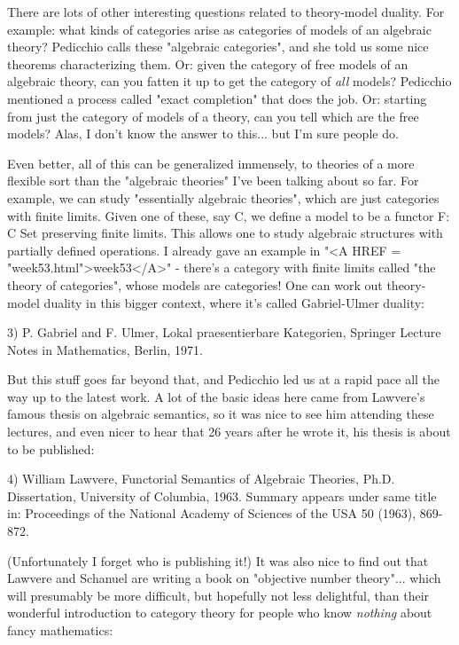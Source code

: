 There are lots of other interesting questions related to
theory-model duality.  For example: what kinds of categories
arise as categories of models of an algebraic theory?  Pedicchio
calls these "algebraic categories", and she told us some nice 
theorems characterizing them.  Or: given the category of free
models of an algebraic theory, can you fatten it up to get 
the category of \emph{all} models?   Pedicchio mentioned a process
called "exact completion" that does the job.  Or: starting 
from just the category of models of a theory, can you tell 
which are the free models?  Alas, I don't know the answer
to this... but I'm sure people do.

Even better, all of this can be generalized immensely, to 
theories of a more flexible sort than the "algebraic theories"
I've been talking about so far.   For example, we can study
"essentially algebraic theories", which are just categories
with finite limits.  Given one of these, say C, we define a
model to be a functor F: C \to  Set preserving finite limits.
This allows one to study algebraic structures with 
partially defined operations.  I already gave an example in 
"<A HREF = "week53.html">week53</A>" - there's a category with finite limits called 
"the theory of categories", whose models are categories!  
One can work out theory-model duality in this bigger context, 
where it's called Gabriel-Ulmer duality:

3) P. Gabriel and F. Ulmer, Lokal praesentierbare Kategorien,
Springer Lecture Notes in Mathematics, Berlin, 1971. 

But this stuff goes far beyond that, and Pedicchio led us at a 
rapid pace all the way up to the latest work.  A lot of the basic 
ideas here came from Lawvere's famous thesis on algebraic
semantics, so it was nice to see him attending these lectures, and 
even nicer to hear that 26 years after he wrote it, his thesis 
is about to be published:

4) William Lawvere, Functorial Semantics of Algebraic Theories,
Ph.D. Dissertation, University of Columbia, 1963.   Summary 
appears under same title in: Proceedings of the National 
Academy of Sciences of the USA 50 (1963), 869-872.

(Unfortunately I forget who is publishing it!)  It was also nice 
to find out that Lawvere and Schanuel are writing a book on 
"objective number theory"... which will presumably be more 
difficult, but hopefully not less delightful, than their
wonderful introduction to category theory for people who 
know \emph{nothing} about fancy mathematics:

